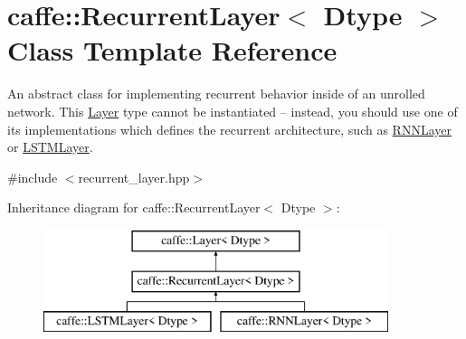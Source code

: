 \hypertarget{classcaffe_1_1RecurrentLayer}{}\section{caffe\+:\+:Recurrent\+Layer$<$ Dtype $>$ Class Template Reference}
\label{classcaffe_1_1RecurrentLayer}


An abstract class for implementing recurrent behavior inside of an unrolled network. This \hyperlink{classcaffe_1_1Layer}{Layer} type cannot be instantiated -- instead, you should use one of its implementations which defines the recurrent architecture, such as \hyperlink{classcaffe_1_1RNNLayer}{R\+N\+N\+Layer} or \hyperlink{classcaffe_1_1LSTMLayer}{L\+S\+T\+M\+Layer}.  




{\ttfamily \#include $<$recurrent\+\_\+layer.\+hpp$>$}

Inheritance diagram for caffe\+:\+:Recurrent\+Layer$<$ Dtype $>$\+:\begin{figure}[H]
\begin{center}
\leavevmode
\includegraphics[height=3.000000cm]{classcaffe_1_1RecurrentLayer}
\end{center}
\end{figure}
